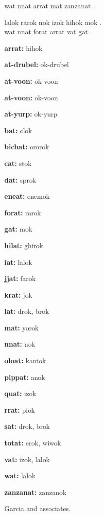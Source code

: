 \documentclass[a4paper, 12pt]{article}
\newlength{\lineseparation}
\begin{document}
 wat nnat arrat mat zanzanat . 

\hrulefill

 lalok rarok nok izok hihok mok . \\[\lineseparation]


 wat nnat forat arrat vat gat . 


\newpage

{
\rm

\textbf{arrat:} hihok

\textbf{at-drubel:} ok-drubel

\textbf{at-voon:} ok-voon

\textbf{at-voon:} ok-voon

\textbf{at-yurp:} ok-yurp

\textbf{bat:} clok

\textbf{bichat:} ororok

\textbf{cat:} stok

\textbf{dat:} sprok

\textbf{eneat:} enemok

\textbf{forat:} rarok

\textbf{gat:} mok

\textbf{hilat:} ghirok

\textbf{iat:} lalok

\textbf{jjat:} farok

\textbf{krat:} jok

\textbf{lat:} drok, brok

\textbf{mat:} yorok

\textbf{nnat:} nok

\textbf{oloat:} kantok

\textbf{pippat:} anok

\textbf{quat:} izok

\textbf{rrat:} plok

\textbf{sat:} drok, brok

\textbf{totat:} erok, wiwok

\textbf{vat:} izok, lalok

\textbf{wat:} lalok

\textbf{zanzanat:} zanzanok
}

\newpage

Garcia and associates. \\[\lineseparation]
\end{document}
